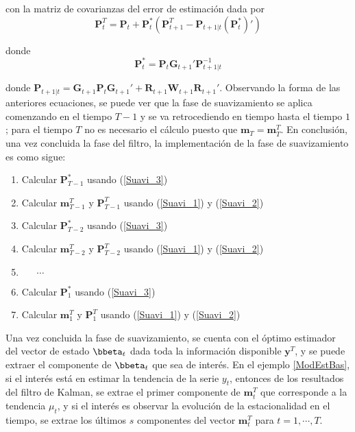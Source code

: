 con la matriz de covarianzas del error de estimación dada por
\begin{equation}\label{Suavi_2}
\mathbf{P}_t^T=\mathbf{P}_t+\mathbf{P}_t^*(\mathbf{P}_{t+1}^T-\mathbf{P}_{t+1|t}(\mathbf{P}_t^*)')
\end{equation}

donde 
\begin{equation}\label{Suavi_3}
\mathbf{P}_t^*=\mathbf{P}_t\mathbf{G}_{t+1}'\mathbf{P}_{t+1|t}^{-1}
\end{equation}

donde $\mathbf{P}_{t+1|t}=\mathbf{G}_{t+1}\mathbf{P}_{t}\mathbf{G}_{t+1}'+\mathbf{R}_{t+1}\mathbf{W}_{t+1}\mathbf{R}_{t+1}'$. Observando la forma de las anteriores ecuaciones, se puede ver que la fase de suavizamiento se aplica comenzando en el tiempo $T-1$ y se va retrocediendo en tiempo hasta el tiempo $1$; para el tiempo $T$ no es necesario el cálculo puesto que $\mathbf{m}_T=\mathbf{m}_T^T$. En conclusión, una vez concluida la fase del filtro, la implementación de la fase de suavizamiento es como sigue:
\begin{enumerate}
\item Calcular $\mathbf{P}_{T-1}^*$ usando (\ref{Suavi_3})
\item Calcular $\mathbf{m}_{T-1}^T$ y $\mathbf{P}_{T-1}^T$ usando (\ref{Suavi_1}) y (\ref{Suavi_2})
\item Calcular $\mathbf{P}_{T-2}^*$ usando (\ref{Suavi_3})
\item Calcular $\mathbf{m}_{T-2}^T$ y $\mathbf{P}_{T-2}^T$ usando (\ref{Suavi_1}) y (\ref{Suavi_2})
\item $\ \ \ \ \ \ \ \cdots$
\item Calcular $\mathbf{P}_{1}^*$ usando (\ref{Suavi_3})
\item Calcular $\mathbf{m}_{1}^T$ y $\mathbf{P}_{1}^T$ usando (\ref{Suavi_1}) y (\ref{Suavi_2})
\end{enumerate}

Una vez concluida la fase de suavizamiento, se cuenta con el óptimo estimador del vector de estado $\bbeta_t$ dada toda la información disponible $\mathbf{y}^T$, y se puede extraer el componente de $\bbeta_t$ que sea de interés. En el ejemplo \ref{ModEstBas}, si el interés está en estimar la tendencia de la serie $y_t$, entonces de los resultados del filtro de Kalman, se extrae el primer componente de $\mathbf{m}_t^T$ que corresponde a la tendencia $\mu_t$, y si el interés es observar la evolución de la estacionalidad en el tiempo, se extrae los últimos $s$ componentes del vector $\mathbf{m}_t^T$ para $t=1,\cdots,T$.  

